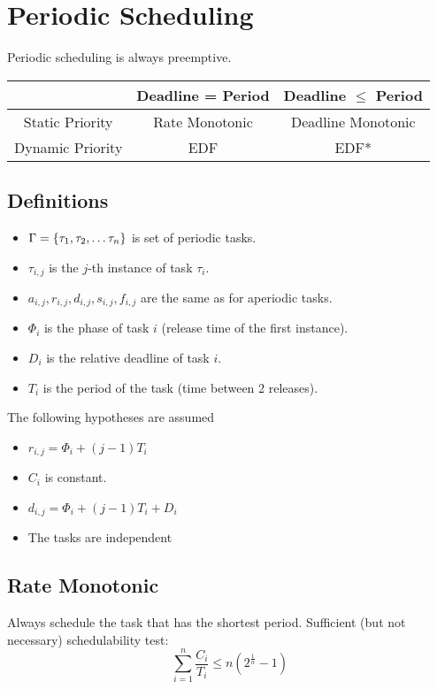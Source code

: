 \section{Periodic Scheduling}
Periodic scheduling is always preemptive.
\begin{center}
	{\renewcommand{\arraystretch}{2}
	\begin{tabular}{|c|c|c|}
		\hline
							& Deadline = Period	& Deadline $\leq$ Period	\tabularnewline\hline
		Static Priority		& Rate Monotonic	& Deadline Monotonic		\tabularnewline\hline
		Dynamic Priority	& EDF				& EDF*						\tabularnewline\hline
	\end{tabular}}
\end{center}

\subsection{Definitions}
\begin{itemize}
	\item $\Gamma = \left\lbrace \tau_1, \tau_2, \dots \tau_n \right\rbrace$	is set of periodic tasks.
	\item $\tau_{i,j}$ is the $j$-th instance of task $\tau_i$.
	\item $a_{i,j}, r_{i,j}, d_{i,j}, s_{i,j}, f_{i,j}$ are the same as for aperiodic tasks.
	\item $\Phi_i$ is the phase of task $i$ (release time of the first instance).
	\item $D_i$ is the relative deadline of task $i$.
	\item $T_i$ is the period of the task (time between 2 releases).
\end{itemize}

The following hypotheses are assumed
\begin{itemize}
	\item $r_{i,j} = \Phi_i + (j - 1) T_i$
	\item $C_i$ is constant.
	\item $d_{i,j} = \Phi_i + (j - 1) T_i + D_i$
	\item The tasks are independent
\end{itemize}

\subsection{Rate Monotonic}
Always schedule the task that has the shortest period.
Sufficient (but not necessary) schedulability test:
\begin{equation*}
	\sum_{i = 1}^n \frac{C_i}{T_i} \leq n \left( 2^{\frac{1}{n}} - 1 \right)
\end{equation*}

